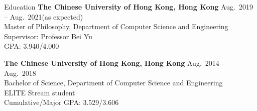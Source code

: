 

\begin{rSection}{Education}
{\bf The Chinese University of Hong Kong, Hong Kong} \hfill {Aug.~2019 -- Aug.~2021(as expected)} \\ 
Master of Philosophy, Department of Computer Science and Engineering \\
Supervisor: Professor Bei Yu \\
GPA: 3.940/4.000

{\bf The Chinese University of Hong Kong, Hong Kong} \hfill {Aug.~2014 -- Aug.~2018} \\ 
Bachelor of Science, Department of Computer Science and Engineering \\
ELITE Stream student \\
Cumulative/Major GPA: 3.529/3.606
\end{rSection}




